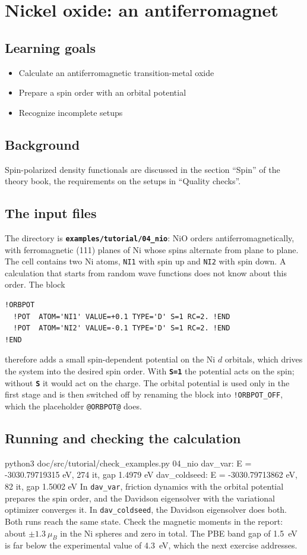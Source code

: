 \documentclass[11pt,a4paper,oneside]{book}
\newcommand{\key}[1]{\textbf{\texttt{#1}}}
\newcommand{\file}[1]{\textbf{\texttt{#1}}}
\newenvironment{shell}{\small\verbatim}{\endverbatim}
\newcommand{\deck}[1]{{\small}}
\newcommand{\goals}{\section{Learning goals}}
\newcommand{\background}{\section{Background}}
\begin{document}
\chapter{Nickel oxide: an antiferromagnet}
\minitoc

\goals
\begin{itemize}
\item Calculate an antiferromagnetic transition-metal oxide
\item Prepare a spin order with an orbital potential
\item Recognize incomplete setups
\end{itemize}

\background
Spin-polarized density functionals are discussed in the section
``Spin'' of the theory book, the requirements on the setups in
``Quality checks''.

\section{The input files}

The directory is \file{examples/tutorial/04\_nio}:
\deck{../../../examples/tutorial/04_nio/nio.strc}
NiO orders antiferromagnetically, with ferromagnetic (111) planes of Ni
whose spins alternate from plane to plane. The cell contains two Ni
atoms, \texttt{NI1} with spin up and \texttt{NI2} with spin down. A
calculation that starts from random wave functions does not know about
this order. The block
\begin{verbatim}
!ORBPOT
  !POT  ATOM='NI1' VALUE=+0.1 TYPE='D' S=1 RC=2. !END
  !POT  ATOM='NI2' VALUE=-0.1 TYPE='D' S=1 RC=2. !END
!END
\end{verbatim}
therefore adds a small spin-dependent potential on the Ni $d$ orbitals,
which drives the system into the desired spin order. With \key{S=1}
the potential acts on the spin; without \key{S} it would act on the
charge. The orbital potential is used only in the first stage and is
then switched off by renaming the block into \texttt{!ORBPOT\_OFF},
which the placeholder \texttt{@ORBPOT@} does.

\section{Running and checking the calculation}

\begin{shell}
python3 doc/src/tutorial/check_examples.py 04_nio
    dav_var: E = -3030.79719315 eV, 274 it, gap 1.4979 eV
    dav_coldseed: E = -3030.79713862 eV, 82 it, gap 1.5002 eV
\end{shell}
In \texttt{dav\_var}, friction dynamics with the orbital potential
prepares the spin order, and the Davidson eigensolver with the
variational optimizer converges it. In \texttt{dav\_coldseed}, the
Davidson eigensolver does both. Both runs reach the same state. Check
the magnetic moments in the report: about $\pm1.3~\mu_B$ in the Ni
spheres and zero in total. The PBE band gap of 1.5~eV is far below the
experimental value of 4.3~eV, which the next exercise addresses.
\end{document}
